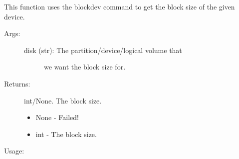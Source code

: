 \documentclass[letterpaper,10pt,english]{sphinxmanual}
\begin{document}
\begin{fulllineitems}
\label{\detokenize{linux:getdevinfo.linux.get_block_size}}

This function uses the blockdev command to get the block size
of the given device.
\begin{description}
\item[{Args:}] \leavevmode\begin{description}
\item[{disk (str):     The partition/device/logical volume that}] \leavevmode
we want the block size for.

\end{description}

\item[{Returns:}] \leavevmode
int/None. The block size.
\begin{itemize}
\item {} 
None - Failed!

\item {} 
int  - The block size.

\end{itemize}

\end{description}

Usage:

\begin{sphinxVerbatim}[commandchars=\\\{\}]
  
\end{sphinxVerbatim}

\end{fulllineitems}

\end{document}
